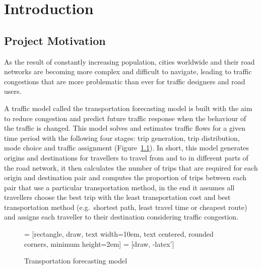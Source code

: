 \chapter{Introduction}



\section{Project Motivation}

As the result of constantly increasing population,
cities worldwide and their road networks are becoming
more complex and difficult to navigate,
leading to traffic congestions that are more problematic than ever
for traffic designers and road users.

A traffic model called the transportation forecasting model is built
with the aim to reduce congestion and predict future traffic response when the behaviour of the traffic is changed.
This model solves and estimates traffic flows for a given time period with the following four stages: trip generation,
trip distribution, mode choice and traffic assignment (Figure~\ref{fig:model}).
In short,
this model generates origins and destinations for travellers to travel from and to in different parts of the road network,
it then calculates the number of trips that are required for each origin and destination pair
and computes the proportion of trips between each pair that use a particular transportation method,
in the end it assumes all travellers choose the best trip with the least transportation cost and best transportation method (e.g.\ shortest path, least travel time or cheapest route) and
assigns each traveller to their destination considering traffic congestion.

\begin{figure}
    \centering
     = [rectangle, draw, text width=10em, text centered, rounded corners, minimum height=2em]
     = [draw, -latex']
    \caption{Transportation forecasting model}
    \label{fig:model}
\end{figure}

